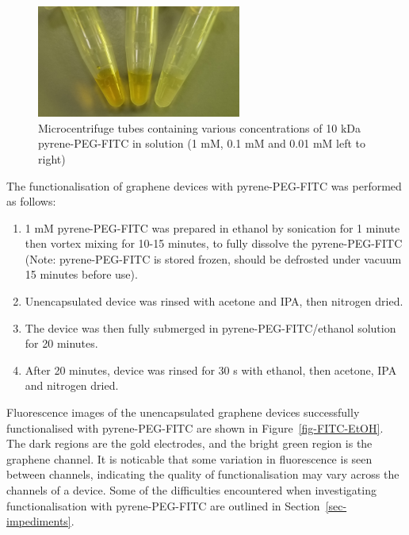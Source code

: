 \documentclass[
  a4paper,
]{scrbook}
\begin{document}
\begin{figure}

{\centering \includegraphics[width=0.6\textwidth,height=\textheight]{figures/ch6/PPF_vials.png}

}

\caption{\label{fig-PPF-concs}Microcentrifuge tubes containing various
concentrations of 10 kDa pyrene-PEG-FITC in solution (1 mM, 0.1 mM and
0.01 mM left to right)}

\end{figure}

The functionalisation of graphene devices with pyrene-PEG-FITC was
performed as follows:

\begin{enumerate}
\def\labelenumi{\arabic{enumi}.}
\item
  1 mM pyrene-PEG-FITC was prepared in ethanol by sonication for 1
  minute then vortex mixing for 10-15 minutes, to fully dissolve the
  pyrene-PEG-FITC (Note: pyrene-PEG-FITC is stored frozen, should be
  defrosted under vacuum 15 minutes before use).
\item
  Unencapsulated device was rinsed with acetone and IPA, then nitrogen
  dried.
\item
  The device was then fully submerged in pyrene-PEG-FITC/ethanol
  solution for 20 minutes.
\item
  After 20 minutes, device was rinsed for 30 s with ethanol, then
  acetone, IPA and nitrogen dried.
\end{enumerate}

Fluorescence images of the unencapsulated graphene devices successfully
functionalised with pyrene-PEG-FITC are shown in
Figure~\ref{fig-FITC-EtOH}. The dark regions are the gold electrodes,
and the bright green region is the graphene channel. It is noticable
that some variation in fluorescence is seen between channels, indicating
the quality of functionalisation may vary across the channels of a
device. Some of the difficulties encountered when investigating
functionalisation with pyrene-PEG-FITC are outlined in
Section~\ref{sec-impediments}.
\end{document}
